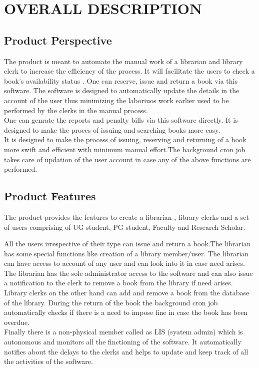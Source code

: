 \documentclass{article}
\begin{document}
\section{OVERALL DESCRIPTION}
\subsection{Product Perspective}
The product is meant to automate the manual work of a librarian and library clerk to increase the efficiency of the process. It will facilitate the users to check a book's availability status . One can reserve, issue and return a book via this software. The software is designed to automatically update the details in the account of the user thus minimizing the laboriuos work earlier used to be performed by the clerks in the manual process.
\\
One can genrate the reports and penalty bills via this software directly. It is designed to make the proces of issuing and searching books more easy.
\\
It is designed to make the process of issuing, reserving and returning of a book more swift and efficient with minimum manual effort.The background cron job takes care of updation of the user account in case any of the above functions are performed.

\subsection{Product Features}
The product provides the features to create a librarian , library clerks and a set of users comprising of UG student, PG student, Faculty and Research Scholar.

All the users irrespective of their type can issue and return a book.The librarian has some special functions like creation of a library member/user. The librarian can have access to account of any user and can look into it in case need arises.\\
The librarian has the sole administrator access to the software and can also issue a notification to the clerk to remove a book from the library if need arises.\\
Library clerks on the other hand can add and remove a book from the database of the library. During the return of the book the background cron job automatically checks if there is a need to impose fine in case the book has been overdue.\\

Finally there is a non-physical member called as LIS (syatem admin) which is autonomous and monitors all the finctioning of the software. It automatically notifies about the delays to the clerks and helps to update and keep track of all the activities of the software.
\end{document}
